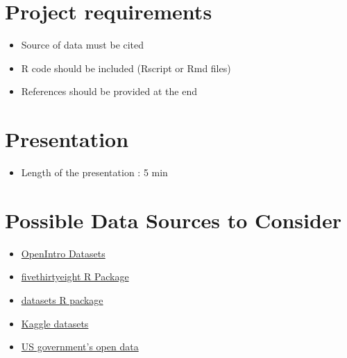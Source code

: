 \documentclass[12pt]{article}
\begin{document}
\section*{Project requirements}
\begin{itemize}
    \item Source of data must be cited
    \item R code should be included (Rscript or Rmd files)
    \item References should be provided at the end
\end{itemize}


\section*{Presentation}
\begin{itemize}
    \item Length of the presentation : 5 min 

\end{itemize}



\section*{Possible Data Sources to Consider}
\begin{itemize}
    \item \href{https://www.openintro.org/data/}{OpenIntro Datasets}
    \item \href{https://cran.r-project.org/web/packages/fivethirtyeight/vignettes/fivethirtyeight.html}{fivethirtyeight 
    R Package}
    \item \href{https://stat.ethz.ch/R-manual/R-devel/library/datasets/html/00Index.html}{datasets R package}
    \item \href{https://www.kaggle.com/datasets}{Kaggle datasets}
    \item \href{https://data.gov/}{US government's open data}
\end{itemize}
\end{document}
